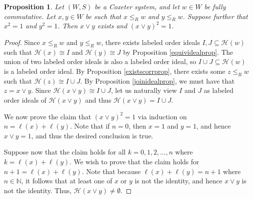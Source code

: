 \documentclass{amsart}
\theoremstyle{plain} %
\newtheorem{prop}[thm]{Proposition}
\theoremstyle{definition}
\def\weakr{\leq_{R}}
\def\N{\mathbb{N}}
\def\H#1{\mathcal{H}(#1)}
\begin{document}
\begin{prop} \label{joinisinvolution}
    Let $ (W,S)$ be a Coxeter system, and let $ w\in W$ be fully commutative. Let $ x,y\in W$ be such that $ x \weakr w$ and $ y\weakr w$. Suppose further that $ x^{2} = 1$ and $ y^{2}=1$. Then $ x\vee y$ exists and $ (x \vee y)^{2}  =1$.
\end{prop}

\begin{proof}
    Since $ x \weakr w$ and $ y \weakr w$, there exists labeled order ideals $I, J \subseteq \H{w}$ such that $\H{x} \cong I $ and $ \H{y} \cong J$ by Proposition \ref{equividealprop}. The union of two labeled order ideals is also a labeled order ideal, so $I \cup J \subseteq \H{w}$ is a labeled order ideal. By Proposition \ref{existscorrprop}, there exists some $ z \weakr w$ such that $ \H{z} \cong I \cup J$. By Proposition \ref{joinidealprop}, we must have that $ z = x \vee y$. Since $ \H{x\vee y} \cong I \cup J$, let us naturally view $ I$ and $J$ as labeled order ideals of $ \H{x\vee y}$ and thus $ \H{x \vee y} = I \cup J$.

    We now prove the claim that $ (x\vee y)^{2} = 1$ via induction on $n= \ell(x) + \ell(y)$. Note that if $ n = 0$, then $ x=1$ and $ y=1$, and hence $ x\vee y = 1$, and thus the desired conclusion is true.

    Suppose now that the claim holds for all $ k =0,1,2,  \dots , n$ where $ k = \ell(x) + \ell(y)$. We wish to prove that the claim holds for $ n+1 = \ell(x) + \ell(y)$. Note that because $ \ell(x) + \ell(y) = n+1$ where $n\in \N$, it follows that at least one of $ x$ or $y$ is not the identity, and hence $ x\vee y$ is not the identity. Thus, $ \H{x \vee y} \neq \emptyset$. 
    

\end{proof}
\end{document}
